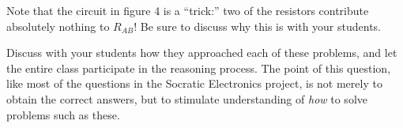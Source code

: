 





Note that the circuit in figure 4 is a ``trick:'' two of the resistors contribute absolutely nothing to $R_{AB}$!  Be sure to discuss why this is with your students.

Discuss with your students how they approached each of these problems, and let the entire class participate in the reasoning process.  The point of this question, like most of the questions in the Socratic Electronics project, is not merely to obtain the correct answers, but to stimulate understanding of {\it how} to solve problems such as these.




